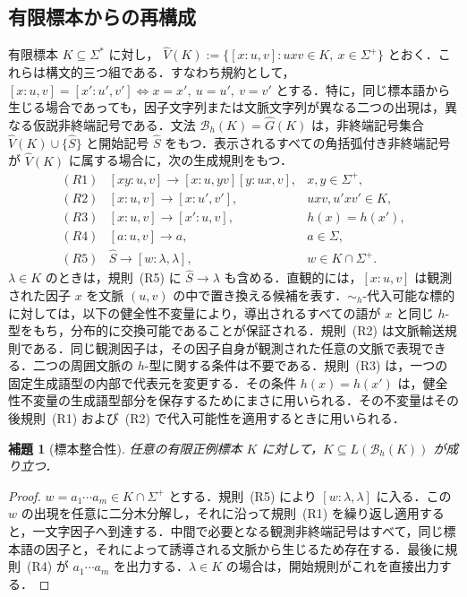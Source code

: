 \documentclass[11pt,a4paper]{ltjsarticle}
\newtheorem{lemma}[theorem]{補題}
\theoremstyle{remark}
\theoremstyle{plain}
\begin{document}
\subsection{有限標本からの再構成}
有限標本 $K\subseteq\Sigma^*$ に対し，
$\widehat V(K):=\{[x:u,v]:uxv\in K,\ x\in\Sigma^+\}$
とおく．これらは構文的三つ組である．すなわち規約として，$[x:u,v]=[x':u',v'] \Longleftrightarrow x=x',\ u=u',\ v=v'$ とする．特に，同じ標本語から生じる場合であっても，因子文字列または文脈文字列が異なる二つの出現は，異なる仮説非終端記号である．文法 $\mathcal B_h(K)=\widehat G(K)$ は，非終端記号集合 $\widehat V(K)\cup\{\widehat S\}$ と開始記号 $\widehat S$ をもつ．表示されるすべての角括弧付き非終端記号が $\widehat V(K)$ に属する場合に，次の生成規則をもつ．
\[
\begin{array}{rll}
(R1)&[xy:u,v]\to[x:u,yv][y:ux,v],&x,y\in\Sigma^+,\\[1mm]
(R2)&[x:u,v]\to[x:u',v'],&uxv,u'xv'\in K,\\[1mm]
(R3)&[x:u,v]\to[x':u,v],&h(x)=h(x'),\\[1mm]
(R4)&[a:u,v]\to a,&a\in\Sigma,\\[1mm]
(R5)&\widehat S\to[w:\lambda,\lambda],&w\in K\cap\Sigma^+.
\end{array}
\]
$\lambda\in K$ のときは，規則~(R5) に $\widehat S\to\lambda$ も含める．直観的には，$[x:u,v]$ は観測された因子 $x$ を文脈 $(u,v)$ の中で置き換える候補を表す．$\sim_h$-代入可能な標的に対しては，以下の健全性不変量により，導出されるすべての語が $x$ と同じ $h$-型をもち，分布的に交換可能であることが保証される．規則~(R2) は文脈輸送規則である．同じ観測因子は，その因子自身が観測された任意の文脈で表現できる．二つの周囲文脈の $h$-型に関する条件は不要である．規則~(R3) は，一つの固定生成語型の内部で代表元を変更する．その条件 $h(x)=h(x')$ は，健全性不変量の生成語型部分を保存するためにまさに用いられる．その不変量はその後規則~(R1) および~(R2) で代入可能性を適用するときに用いられる．

\begin{lemma}[標本整合性]\label{lem:sample-consistency}
任意の有限正例標本 $K$ に対して，$K\subseteq L(\mathcal B_h(K))$ が成り立つ．
\end{lemma}
\begin{proof}
$w=a_1\cdots a_m\in K\cap\Sigma^+$ とする．規則~(R5) により $[w:\lambda,\lambda]$ に入る．この $w$ の出現を任意に二分木分解し，それに沿って規則~(R1) を繰り返し適用すると，一文字因子へ到達する．中間で必要となる観測非終端記号はすべて，同じ標本語の因子と，それによって誘導される文脈から生じるため存在する．最後に規則~(R4) が $a_1\cdots a_m$ を出力する．$\lambda\in K$ の場合は，開始規則がこれを直接出力する．
\end{proof}
\end{document}
